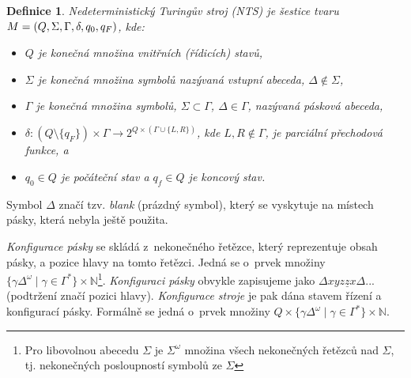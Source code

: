 \documentclass[twocolumn, 11pt, a4paper]{article}
\newtheorem{definition}{Definice}
\begin{document}
	\begin{definition}
	\emph{Nedeterministický Turingův stroj} (NTS) je šes\-ti\-ce tvaru
		$M = (\mathnormal{Q}, \Sigma, \Gamma, \delta, q_{0}, q_{F})$, kde:
		\begin{itemize}
			\item{
				$Q$ je konečná množina vnitřních (řídicích) stavů,
			}
			\item{
				$\Sigma$ je konečná množina symbolů nazývaná \textnormal{vstupní abeceda}, $\Delta \notin \Sigma$,
			}
			\item{
				$\Gamma$ je konečná množina symbolů, $\Sigma \subset \Gamma$, $\Delta \in \Gamma$, nazývaná \textnormal{pásková abeceda},
			}
			\item{
				$\delta: (Q \setminus \{q_F\} ) \times \Gamma \rightarrow 2^{Q \times (\Gamma \cup \{L, R\})}$, kde $L, R \notin \Gamma$, je parciální \textnormal{přechodová funkce,} a
			}
			\item{
				$q_0 \in Q$ je \textnormal{počáteční stav} a $q_f \in Q$ je koncový stav.
			}
		\end{itemize}
	\end{definition} 

	Symbol $\Delta$ značí tzv. \textit{blank} (prázdný symbol), který se vyskytuje na místech pásky, která nebyla ještě použita.

	\textit{Konfigurace pásky} se skládá z~nekonečného řetězce, který reprezentuje obsah pásky, a pozice hlavy na tomto řetězci. Jedná se o~prvek množiny
		$\{\gamma \Delta^{\omega}\;|\;\gamma \in \Gamma^*\} \times \mathbb{N}$\footnote{
		Pro libovolnou abecedu $\Sigma$ je $\Sigma^{\omega}$ množina všech nekonečných řetězců nad $\Sigma$, tj. nekonečných posloupností symbolů ze $\Sigma$
		}.
	\textit{Konfiguraci pásky} obvykle zapisujeme jako
		$\Delta xyz\underline{z}x\Delta $... (podtržení značí pozici hlavy).
	\textit{Konfigurace stroje} je pak dána stavem řízení a konfigurací pásky. Formálně se jedná o~prvek množiny
		$Q \times \{\gamma \Delta^{\omega}\;|\;\gamma \in \Gamma^*\} \times \mathbb{N}$.
\end{document}
